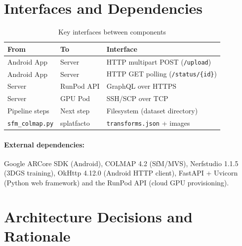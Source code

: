 \section{Interfaces and Dependencies}

\begin{table}[htbp]
\centering
\small
\caption{Key interfaces between components}
\label{tab:interfaces}
\begin{tabular}{p{3cm}p{3cm}p{5cm}}
\toprule
\textbf{From} & \textbf{To} & \textbf{Interface} \\
\midrule
Android App & Server & HTTP multipart POST (\texttt{/upload}) \\
Android App & Server & HTTP GET polling (\texttt{/status/\{id\}}) \\
Server & RunPod API & GraphQL over HTTPS \\
Server & GPU Pod & SSH/SCP over TCP \\
Pipeline steps & Next step & Filesystem (dataset directory) \\
\texttt{sfm\_colmap.py} & splatfacto & \texttt{transforms.json} + images \\
\bottomrule
\end{tabular}
\end{table}

\paragraph{External dependencies:} Google ARCore SDK (Android), COLMAP 4.2 (SfM/MVS), Nerfstudio 1.1.5 (3DGS training), OkHttp 4.12.0 (Android HTTP client), FastAPI + Uvicorn (Python web framework) and the RunPod API (cloud GPU provisioning).

\section{Architecture Decisions and Rationale}

